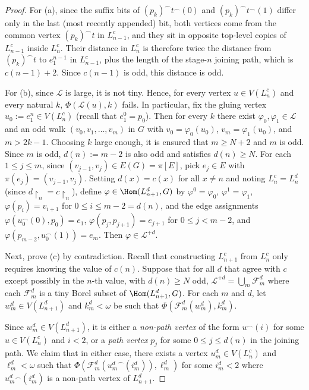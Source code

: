 \begin{proof}
    For (a), since the suffix bits of $(p_k)^\smallfrown t^\smallfrown(0)$ and $(p_k)^\smallfrown t^\smallfrown(1)$ differ only in the last (most recently appended) bit, both vertices come from the common vertex $(p_k)^\smallfrown t$ in $L^c_{n-1}$, and they sit in opposite top-level copies of $L^c_{n-1}$ inside $L^c_n$.
    Their distance in $L^c_n$ is therefore twice the distance from $(p_k)^\smallfrown t$ to $e_1^{n-1}$ in $L^c_{n-1}$, plus the length of the stage-$n$ joining path, which is $c(n-1)+2$.
    Since $c(n-1)$ is odd, this distance is odd.

    For (b), since $\mathcal L$ is large, it is not tiny.
    Hence, for every vertex $u\in V(L^c_n)$ and every natural $k$, $\Phi(\mathcal L(u),k)$ fails.
    In particular, fix the gluing vertex $u_0:=e_1^n\in V(L^c_n)$ (recall that $e_1^0=p_0$).
    Then for every $k$ there exist $\varphi_0,\varphi_1\in\mathcal L$ and an odd walk $(v_0,v_1,\dots,v_m)$ in $G$ with $v_0=\varphi_0(u_0)$, $v_m=\varphi_1(u_0)$, and $m>2k-1$.
    Choosing $k$ large enough, it is ensured that $m\geq N+2$ and $m$ is odd.
    Since $m$ is odd, $d(n):=m-2$ is also odd and satisfies $d(n)\geq N$.
    For each $1\leq j\leq m$, since $(v_{j-1},v_j)\in E(G)=\pi[E]$, pick $e_j\in E$ with $\pi(e_j)=(v_{j-1},v_j)$.
    Setting $d(x)=c(x)$ for all $x\neq n$ and noting $L^c_n=L^d_n$ (since $d\restriction_n=c\restriction_n$), define $\varphi\in\Hom(L_{n+1}^d,G)$ by $\varphi^0=\varphi_0$, $\varphi^1=\varphi_1$, $\varphi(p_i)=v_{i+1}$ for $0\leq i\leq m-2=d(n)$, and the edge assignments $\varphi(u_0^\frown (0),p_0)=e_1$, $\varphi(p_j,p_{j+1})=e_{j+1}$ for $0\leq j<m-2$, and $\varphi(p_{m-2},u_0^\frown (1))=e_m$.
    Then $\varphi\in\mathcal L^{+d}$.

    Next, prove (c) by contradiction.
    Recall that constructing $L^c_{n+1}$ from $L^c_n$ only requires knowing the value of $c(n)$.
    Suppose that for all $d$ that agree with $c$ except possibly in the $n$-th value, with $d(n)\geq N$ odd, $\mathcal L^{+d}=\bigcup_m\mathcal F^d_m$ where each $\mathcal F^d_m$ is a tiny Borel subset of $\Hom(L^d_{n+1},G)$.
    For each $m$ and $d$, let $w^d_m\in V(L^d_{n+1})$ and $k^d_m<\omega$ be such that $\Phi(\mathcal F^d_m(w^d_m),k^d_m)$.
    
    Since $w^d_m\in V(L^d_{n+1})$, it is either a \emph{non-path vertex} of the form $u^\smallfrown(i)$ for some $u\in V(L^c_n)$ and $i<2$, or a \emph{path vertex} $p_j$ for some $0\leq j\leq d(n)$ in the joining path.
    We claim that in either case, there exists a vertex $u^d_m\in V(L^c_n)$ and $\ell^d_m<\omega$ such that $\Phi(\mathcal F^d_m({u^d_m}^\smallfrown(i^d_m)),\ell^d_m)$ for some $i^d_m<2$ where $u^d_m{}^\smallfrown(i^d_m)$ is a non-path vertex of $L^d_{n+1}$.


\end{proof}
